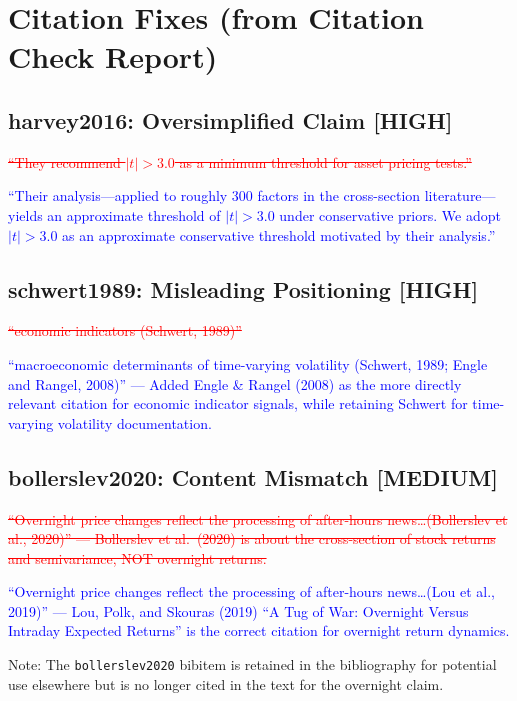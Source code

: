 \documentclass[12pt,a4paper]{article}
\newcommand{\added}[1]{\textcolor{blue}{#1}}
\newcommand{\removed}[1]{\textcolor{red}{\sout{#1}}}
\begin{document}
\section{Citation Fixes (from Citation Check Report)}

\subsection{harvey2016: Oversimplified Claim [HIGH]}

\removed{``They recommend $|t| > 3.0$ as a minimum threshold for asset pricing tests.''}

\added{``Their analysis---applied to roughly 300 factors in the cross-section literature---yields an approximate threshold of $|t| > 3.0$ under conservative priors. We adopt $|t| > 3.0$ as an approximate conservative threshold motivated by their analysis.''}

\subsection{schwert1989: Misleading Positioning [HIGH]}

\removed{``economic indicators (Schwert, 1989)''}

\added{``macroeconomic determinants of time-varying volatility (Schwert, 1989; Engle and Rangel, 2008)'' --- Added Engle \& Rangel (2008) as the more directly relevant citation for economic indicator signals, while retaining Schwert for time-varying volatility documentation.}

\subsection{bollerslev2020: Content Mismatch [MEDIUM]}

\removed{``Overnight price changes reflect the processing of after-hours news\ldots (Bollerslev et al., 2020)'' --- Bollerslev et al.\ (2020) is about the cross-section of stock returns and semivariance, NOT overnight returns.}

\added{``Overnight price changes reflect the processing of after-hours news\ldots (Lou et al., 2019)'' --- Lou, Polk, and Skouras (2019) ``A Tug of War: Overnight Versus Intraday Expected Returns'' is the correct citation for overnight return dynamics.}

Note: The \texttt{bollerslev2020} bibitem is retained in the bibliography for potential use elsewhere but is no longer cited in the text for the overnight claim.
\end{document}

